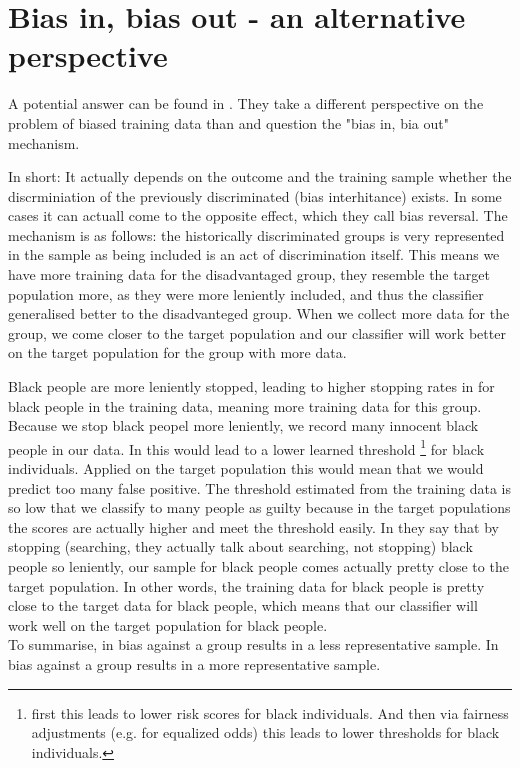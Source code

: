 \section*{Bias in, bias out - an alternative perspective}

A potential answer can be found in \cite{RambachanBBOEFW}. They take a different perspective on the problem of biased training data than \cite{kallus} and question the "bias in, bia out" mechanism.

In short: It actually depends on the outcome and the training sample whether the discrminiation of the previously discriminated (bias interhitance) exists. In some cases it can actuall come to the opposite effect, which they call bias reversal.
The mechanism is as follows: the historically discriminated groups is very represented in the sample as being included is an act of discrimination itself. This means we have more training data for the disadvantaged group, they resemble the target population more, as they were more leniently included, and thus the classifier generalised better to the disadvanteged group.
When we collect more data for the group, we come closer to the target population and our classifier will work better on the target population for the group with more data.


Black people are more leniently stopped, leading to higher stopping rates in for black people in the training data, meaning
more training data for this group. Because we stop black peopel more leniently, we record many innocent black people in our data.
In \cite{kallus} this would lead to a lower learned threshold \footnote{first this leads to lower risk scores for black individuals. And then via fairness adjustments (e.g. for equalized odds) this leads to lower thresholds for black individuals.}
for black individuals. Applied on the target population this would mean that we would predict too many false positive. The threshold estimated from the training 
data is so low that we classify to many people as guilty because in the target populations the scores are actually higher and meet the threshold easily.
In \cite{RambachanBBOEFW} they say that by stopping (searching, they actually talk about searching, not stopping) black people so leniently, our sample for black people comes actually pretty
close to the target population.
In other words, the training data for black people is pretty close to the target data for black people, which means that our classifier will work well on the
target population for black people. \\
To summarise, in \cite{kallus} bias against a group results in a less representative sample. In \cite{RambachanBBOEFW} bias against a group results in a more representative sample.


